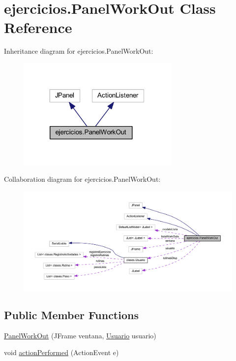 \hypertarget{classejercicios_1_1_panel_work_out}{}\section{ejercicios.\+Panel\+Work\+Out Class Reference}
\label{classejercicios_1_1_panel_work_out}


Inheritance diagram for ejercicios.\+Panel\+Work\+Out\+:
\nopagebreak
\begin{figure}[H]
\begin{center}
\leavevmode
\includegraphics[width=224pt]{classejercicios_1_1_panel_work_out__inherit__graph}
\end{center}
\end{figure}


Collaboration diagram for ejercicios.\+Panel\+Work\+Out\+:
\nopagebreak
\begin{figure}[H]
\begin{center}
\leavevmode
\includegraphics[width=350pt]{classejercicios_1_1_panel_work_out__coll__graph}
\end{center}
\end{figure}
\subsection*{Public Member Functions}
\begin{DoxyCompactItemize}
\item 
\mbox{\hyperlink{classejercicios_1_1_panel_work_out_a8a77876aa6351e2e5defd215f313017c}{Panel\+Work\+Out}} (J\+Frame ventana, \mbox{\hyperlink{classclases_1_1_usuario}{Usuario}} usuario)
\item 
void \mbox{\hyperlink{classejercicios_1_1_panel_work_out_a19b4f5f27b47a42f353acbb75d4b877e}{action\+Performed}} (Action\+Event e)
\end{DoxyCompactItemize}


